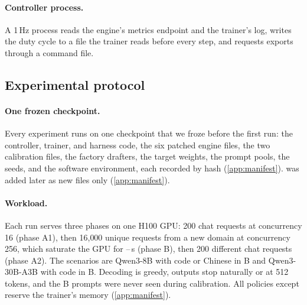 \paragraph{Controller process.} A 1\,Hz process reads the engine's metrics endpoint and the trainer's log, writes the duty cycle to a file the trainer reads before every step, and requests exports through a command file.

\subsection{Experimental protocol}\label{sec:setup}

\paragraph{One frozen checkpoint.} Every experiment runs on one checkpoint that we froze before the first run: the controller, trainer, and harness code, the six patched engine files, the two calibration files, the factory drafters, the target weights, the prompt pools, the seeds, and the software environment, each recorded by hash (\cref{app:manifest}).  was added later as new files only (\cref{app:manifest}).

\paragraph{Workload.} Each run serves three phases on one H100 GPU: 200 chat requests at concurrency 16 (phase A1), then 16{,}000 unique requests from a new domain at concurrency 256, which saturate the GPU for --\,s (phase B), then 200 different chat requests (phase A2). The scenarios are Qwen3-8B with code or Chinese in B and Qwen3-30B-A3B with code in B. Decoding is greedy, outputs stop naturally or at 512 tokens, and the B prompts were never seen during calibration. All policies except  reserve the trainer's memory (\cref{app:manifest}).


